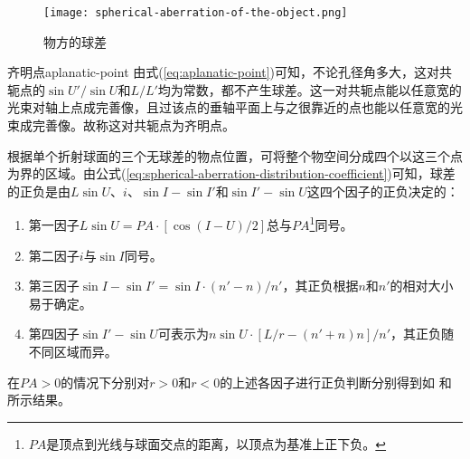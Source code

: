 \documentclass[cn,10pt,chinesefont=founder,math=mtpro2,cite=super,toc=onecol,twoside,openany]{elegantbook}
\begin{document}
\begin{figure}[htbp]
	\centering
	\texttt{[image: spherical-aberration-of-the-object.png]}
	\caption{物方的球差}
	\label{fig:spherical-aberration-of-the-object}
\end{figure}

\begin{definition}{齐明点}{aplanatic-point}
	由式(\ref{eq:aplanatic-point})可知，不论孔径角多大，这对共轭点的$\sin U'/\sin U$和$L/L'$均为常数，都不产生球差。这一对共轭点能以任意宽的光束对轴上点成完善像，且过该点的垂轴平面上与之很靠近的点也能以任意宽的光束成完善像。故称这对共轭点为齐明点。
\end{definition}

根据单个折射球面的三个无球差的物点位置，可将整个物空间分成四个以这三个点为界的区域。由公式(\ref{eq:spherical-aberration-distribution-coefficient})可知，球差的正负是由$L\sin U$、$i$、$\sin I-\sin I'$和$\sin I'-\sin U$这四个因子的正负决定的：
\begin{enumerate}
	\item 第一因子$L\sin U=PA\cdot[\cos(I-U)/2]$总与$PA$\footnote{$PA$是顶点到光线与球面交点的距离，以顶点为基准上正下负。}同号。
	\item 第二因子$i$与$\sin I$同号。
	\item 第三因子$\sin I-\sin I'=\sin I\cdot(n'-n)/n'$，其正负根据$n$和$n'$的相对大小易于确定。
	\item 第四因子$\sin I'-\sin U$可表示为$n\sin U\cdot[L/r-(n'+n)n]/n'$，其正负随不同区域而异。
\end{enumerate}
在$PA>0$的情况下分别对$r>0$和$r<0$的上述各因子进行正负判断分别得到如 和 所示结果。

\begin{table}[htbp]
	\centering
	\caption{$r>0$的球面在各区间内的球差正负}
	\label{tab:spherical-aberration-of-sphere-in-each-interval-1}
\end{table}
\end{document}
